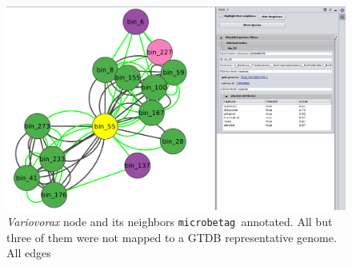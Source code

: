\documentclass[sn-mathphys,Numbered]{sn-jnl}  %
\theoremstyle{thmstyleone}%
\theoremstyle{thmstyletwo}%
\theoremstyle{thmstylethree}%
\newcommand{\microbetag}{\texttt{microbetag }}
\begin{document}
\begin{appendices}




        \begin{figure}[H]
            \includegraphics*[width=0.9\columnwidth]{figs/node22Neigh.png}
            \caption{
                \textit{Variovorax} node and its neighbors \microbetag annotated. All but three of them were not mapped to a GTDB representative genome. 
                All edges  
            }
            \label{fig:s1}
        \end{figure}



        



        \clearpage





\end{appendices}


\newpage

\end{document}
